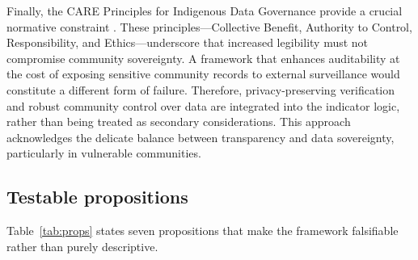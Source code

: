 \documentclass[sigconf,anonymous]{acmart}
\begin{document}
Finally, the CARE Principles for Indigenous Data Governance provide a crucial normative constraint \cite{carroll2020}. These principles—Collective Benefit, Authority to Control, Responsibility, and Ethics—underscore that increased legibility must not compromise community sovereignty. A framework that enhances auditability at the cost of exposing sensitive community records to external surveillance would constitute a different form of failure. Therefore, privacy-preserving verification and robust community control over data are integrated into the indicator logic, rather than being treated as secondary considerations. This approach acknowledges the delicate balance between transparency and data sovereignty, particularly in vulnerable communities.

\subsection{Testable propositions}

Table~\ref{tab:props} states seven propositions that make the framework falsifiable rather than purely descriptive.
\end{document}
